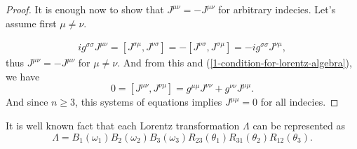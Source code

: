 \documentclass[main.tex]{subfiles}
\begin{document}
\begin{proof}
It is enough now to show that $J^{\mu\nu} = -J^{\mu\nu}$ for arbitrary indecies.
Let's assume first $\mu \not= \nu$.

\begin{align}
ig^{\sigma\sigma}J^{\mu\nu} = [J^{\sigma\mu}, J^{\nu\sigma}] = -[J^{\nu\sigma}, J^{\sigma\mu}] = - ig^{\sigma\sigma} J^{\nu\mu},
\end{align}
thus $J^{\mu\nu} = -J^{\mu\nu}$ for $\mu\not=\nu$. And from this and (\ref{1-condition-for-lorentz-algebra}), we have
\begin{equation}
0 = [J^{\mu\nu}, J^{\nu\mu}] = g^{\mu\mu}J^{\nu\nu} + g^{\nu\nu}J^{\mu\mu}.
\end{equation}
And since $n\geq 3$, this systems of equations implies $J^{\mu\mu} = 0$ for all indecies. 
\end{proof}


It is well known fact that each Lorentz transformation $\Lambda$ can be represented as
\begin{equation}
\Lambda = B_1(\omega_1)B_2(\omega_2)B_3(\omega_3)R_{23}(\theta_1)R_{31}(\theta_2)R_{12}(\theta_3).
\end{equation}
\end{document}
